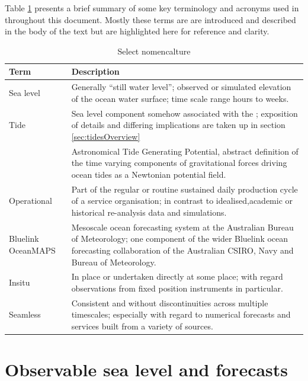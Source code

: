 Table \ref{table:jargon} presents a brief summary of some key terminology and acronyms used in throughout this document.   Mostly these terms are are introduced and described in the body of the text but are highlighted here for reference and clarity.
\begin{table}[h]\centering
    \begin{tabular}{ |p{3cm}|p{11cm}| }
    \hline
    Term & Description  \\
    \hline
    Sea level & Generally ``still water level''; observed or simulated elevation of the ocean water surface; time scale range hours to weeks.\\
    \hline
    Tide & Sea level component somehow associated with the \ATGP{}; exposition of details and differing implications are taken up in section \ref{sec:tidesOverview}\\
    \hline
    \ATGP{} & Astronomical Tide Generating Potential, abstract definition of the time varying components of gravitational forces driving ocean tides as a Newtonian potential field.\\
    \hline
    Operational & Part of the regular or routine sustained daily production cycle of a service organisation;  in contrast to idealised,academic or historical re-analysis data and simulations.\\
    \hline
    Bluelink OceanMAPS & Mesoscale ocean forecasting system at the Australian Bureau of Meteorology; one component of the wider Bluelink ocean forecasting collaboration of the Australian CSIRO, Navy and Bureau of Meteorology.\\
    \hline
    Insitu & In place or undertaken directly at some place; with regard observations from fixed position instruments in particular. \\
    \hline
    Seamless &  Consistent and without discontinuities across multiple timescales; especially with regard to numerical forecasts and services built from a variety of sources. \\
    \hline
    \end{tabular}
    \caption{Select nomencalture}
    \label{table:jargon}
\end{table}


\section{Observable sea level and forecasts}

